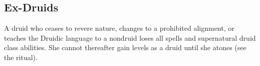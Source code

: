 \begin{comment}
    Her accuracy is equal to her druid level \add her Constitution.
    The plants appear on any surface, and will continue to grow if they can survive, though they may die quickly if they appear on inhospitable terrain.
    \subcf{17th -- Flight}
    The druid gains a fly speed equal to her land speed, with good maneuverability.
    She may remain flying for up to 5 rounds at a time.
    After that, she must land for 1 round before she can fly again.
    See \pcref{Flying}, for more details.
    \subcf{17th -- Flaming Soul}
    The druid gains the fire subtype, making her immune to fire but giving her a 50\% vulnerability to cold damage.
    In addition, whenever she deals fire damage to a creature, the creature is \ignited for 5 rounds.
    \subcf{17th -- Sunblessed Rejuvenation}
    The druid gains fast healing equal to her druid level as long as she remains in sunlight or touches a plant of her size or larger.
    \subcf{17th -- Sunscour}
    This aspect functions like the heart of the sun natural aspect, except that it also suppresses shadow effects and the visual components of illusions within the area of bright light.

    \subcf{17th -- Water's Flow}
    As a swift action, the druid can transform herself into a rushing flow of water with a volume roughly equal to her normal volume until the end of her turn.
    In this form, she may move wherever water could go, but she cannot take other actions, such as jumping, attacking, or casting spells.
    Her speed is halved when moving uphill and doubled when moving downhill.
    She may move through squares occupied by creatures or threatened by blocking enemies without penalty.
    She may return to her normal form as a free action.
    \par If the water is split, she may reform from anywhere the water has reached, to as little as a single ounce of water.
    If not even an ounce of water exists contiguously, her body reforms from the largest available parts of water, cut into pieces of appropriate size.
    This usually causes the druid to die.

\end{comment}

    \subsection{Ex-Druids}
        A druid who ceases to revere nature, changes to a prohibited alignment, or teaches the Druidic language to a nondruid loses all spells and supernatural druid class abilities.
        She cannot thereafter gain levels as a druid until she atones (see the  ritual).

